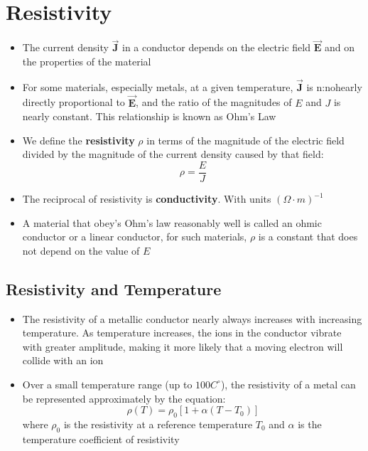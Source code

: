 \documentclass[11pt, a4paper]{article}
\begin{document}
\section[25.2, Resistivity]{Resistivity}
\begin{itemize}
    \item The current density $\vec{\mathbf{J}}$ in a conductor depends on the electric
        field $\vec{\mathbf{E}}$ and on the properties of the material
    \item For some materials, especially metals, at a given temperature,
        $\vec{\mathbf{J}}$ is n:nohearly directly proportional to $\vec{\mathbf{E}}$, and the
        ratio of the magnitudes of $E$ and $J$ is nearly constant. This relationship is
        known as Ohm's Law
    \item We define the \textbf{resistivity} $\rho$ in terms of the magnitude of the
        electric field divided by the magnitude of the current density caused by that
        field:
        \begin{equation}
            \rho = \frac{E}{J}
        \end{equation}
    \item The reciprocal of resistivity is \textbf{conductivity}. With units
        $(\Omega\cdot m)^{-1}$
    \item A material that obey's Ohm's law reasonably well is called an ohmic conductor
        or a linear conductor, for such materials, $\rho$ is a constant that does not
        depend on the value of $E$
\end{itemize}

\subsection{Resistivity and Temperature}
\begin{itemize}
    \item The resistivity of a metallic conductor nearly always increases with increasing
        temperature. As temperature increases, the ions in the conductor vibrate with
        greater amplitude, making it more likely that a moving electron will collide with
        an ion
    \item Over a small temperature range (up to $100 C^{\circ}$), the resistivity of a
        metal can be represented approximately by the equation:
        \begin{equation}
            \rho(T) = \rho_0 [1 + \alpha(T-T_0)]
        \end{equation}
        where $\rho_0$ is the resistivity at a reference temperature $T_0$ and $\alpha$
        is the temperature coefficient of resistivity
\end{itemize}
\end{document}

